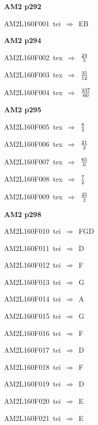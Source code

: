 \par\vfill\eject
{\bf\hfill AM2 p292\hfill\hbox{}}\par\bigskip
{\sixrm AM2L160F001\ {\sixit tei}\ }$\Rightarrow$\ EB\par\smallskip

\par\vfill\eject
{\bf\hfill AM2 p294\hfill\hbox{}}\par\bigskip
{\sixrm AM2L160F002\ {\sixit tex}\ }$\Rightarrow$\ ${24\over 5}$\par\smallskip
{\sixrm AM2L160F003\ {\sixit tex}\ }$\Rightarrow$\ ${35\over 12}$\par\smallskip
{\sixrm AM2L160F004\ {\sixit tex}\ }$\Rightarrow$\ ${337\over 60}$\par\smallskip

\par\vfill\eject
{\bf\hfill AM2 p295\hfill\hbox{}}\par\bigskip
{\sixrm AM2L160F005\ {\sixit tex}\ }$\Rightarrow$\ ${8\over 3}$\par\smallskip
{\sixrm AM2L160F006\ {\sixit tex}\ }$\Rightarrow$\ ${21\over 2}$\par\smallskip
{\sixrm AM2L160F007\ {\sixit tex}\ }$\Rightarrow$\ ${65\over 6}$\par\smallskip
{\sixrm AM2L160F008\ {\sixit tex}\ }$\Rightarrow$\ ${7\over 2}$\par\smallskip
{\sixrm AM2L160F009\ {\sixit tex}\ }$\Rightarrow$\ ${25\over 2}$\par\smallskip

\par\vfill\eject
{\bf\hfill AM2 p298\hfill\hbox{}}\par\bigskip
{\sixrm AM2L160F010\ {\sixit tei}\ }$\Rightarrow$\ FGD\par\smallskip
{\sixrm AM2L160F011\ {\sixit tei}\ }$\Rightarrow$\ D\par\smallskip
{\sixrm AM2L160F012\ {\sixit tei}\ }$\Rightarrow$\ F\par\smallskip
{\sixrm AM2L160F013\ {\sixit tei}\ }$\Rightarrow$\ G\par\smallskip
{\sixrm AM2L160F014\ {\sixit tei}\ }$\Rightarrow$\ A\par\smallskip
{\sixrm AM2L160F015\ {\sixit tei}\ }$\Rightarrow$\ G\par\smallskip
{\sixrm AM2L160F016\ {\sixit tei}\ }$\Rightarrow$\ F\par\smallskip
{\sixrm AM2L160F017\ {\sixit tei}\ }$\Rightarrow$\ D\par\smallskip
{\sixrm AM2L160F018\ {\sixit tei}\ }$\Rightarrow$\ F\par\smallskip
{\sixrm AM2L160F019\ {\sixit tei}\ }$\Rightarrow$\ D\par\smallskip
{\sixrm AM2L160F020\ {\sixit tei}\ }$\Rightarrow$\ E\par\smallskip
{\sixrm AM2L160F021\ {\sixit tei}\ }$\Rightarrow$\ E\par\smallskip

